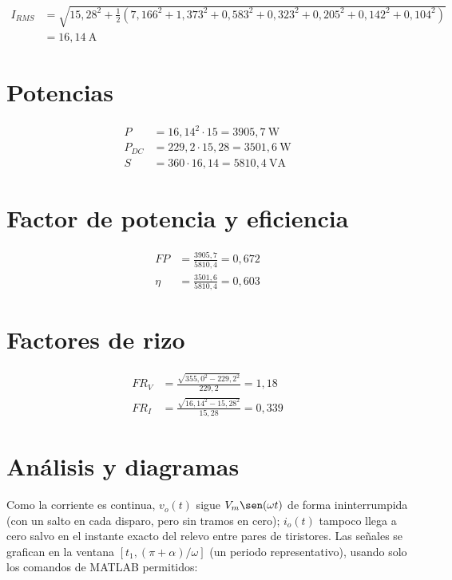 \documentclass[11pt]{article}
\begin{document}
\begin{align*}
I_{RMS} &= \sqrt{15{,}28^2 + \tfrac{1}{2}\left(7{,}166^2+1{,}373^2+0{,}583^2+0{,}323^2+0{,}205^2+0{,}142^2+0{,}104^2\right)} \\
        &= \boxed{16{,}14\ \text{A}}
\end{align*}

\section*{Potencias}

\begin{align*}
P &= 16{,}14^2 \cdot 15 = \boxed{3905{,}7\ \text{W}} \\
P_{DC} &= 229{,}2 \cdot 15{,}28 = \boxed{3501{,}6\ \text{W}} \\
S &= 360 \cdot 16{,}14 = \boxed{5810{,}4\ \text{VA}}
\end{align*}

\section*{Factor de potencia y eficiencia}

\begin{align*}
FP &= \frac{3905{,}7}{5810{,}4} = \boxed{0{,}672} \\
\eta &= \frac{3501{,}6}{5810{,}4} = \boxed{0{,}603}
\end{align*}

\section*{Factores de rizo}

\begin{align*}
FR_V &= \frac{\sqrt{355{,}0^2 - 229{,}2^2}}{229{,}2} = \boxed{1{,}18} \\
FR_I &= \frac{\sqrt{16{,}14^2 - 15{,}28^2}}{15{,}28} = \boxed{0{,}339}
\end{align*}

\section*{An\'alisis y diagramas}

Como la corriente es continua, $v_o(t)$ sigue $V_m\sen(\omega t)$ de forma
ininterrumpida (con un salto en cada disparo, pero sin tramos en cero); $i_o(t)$
tampoco llega a cero salvo en el instante exacto del relevo entre pares de
tiristores. Las se\~nales se grafican en la ventana $[t_1,(\pi+\alpha)/\omega]$
(un periodo representativo), usando solo los comandos de MATLAB permitidos:
\end{document}
